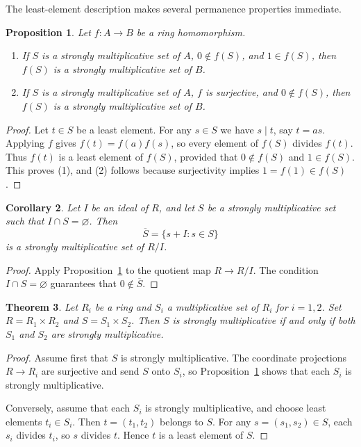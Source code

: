 \documentclass[11pt]{amsart}
\newtheorem{theorem}{Theorem}[section]
\newtheorem{proposition}[theorem]{Proposition}
\newtheorem{corollary}[theorem]{Corollary}
\theoremstyle{definition}
\theoremstyle{remark}
\begin{document}
The least-element description makes several permanence properties immediate.

\begin{proposition}\label{prop:hom}
Let $f \colon A \to B$ be a ring homomorphism.
\begin{enumerate}
\item If $S$ is a strongly multiplicative set of $A$, $0 \notin f(S)$, and $1 \in f(S)$, then $f(S)$ is a strongly multiplicative set of $B$.
\item If $S$ is a strongly multiplicative set of $A$, $f$ is surjective, and $0 \notin f(S)$, then $f(S)$ is a strongly multiplicative set of $B$.
\end{enumerate}
\end{proposition}

\begin{proof}
Let $t \in S$ be a least element.
For any $s \in S$ we have $s \mid t$, say $t=as$.
Applying $f$ gives $f(t)=f(a)f(s)$, so every element of $f(S)$ divides $f(t)$.
Thus $f(t)$ is a least element of $f(S)$, provided that $0 \notin f(S)$ and $1 \in f(S)$.
This proves (1), and (2) follows because surjectivity implies $1=f(1)\in f(S)$.
\end{proof}

\begin{corollary}\label{cor:factor}
Let $I$ be an ideal of $R$, and let $S$ be a strongly multiplicative set such that $I \cap S=\varnothing$.
Then
\[
\overline S=\{s+I : s \in S\}
\]
is a strongly multiplicative set of $R/I$.
\end{corollary}

\begin{proof}
Apply Proposition~\ref{prop:hom} to the quotient map $R \to R/I$.
The condition $I \cap S=\varnothing$ guarantees that $0 \notin \overline S$.
\end{proof}

\begin{theorem}\label{thm:product}
Let $R_i$ be a ring and $S_i$ a multiplicative set of $R_i$ for $i=1,2$.
Set $R=R_1 \times R_2$ and $S=S_1 \times S_2$.
Then $S$ is strongly multiplicative if and only if both $S_1$ and $S_2$ are strongly multiplicative.
\end{theorem}

\begin{proof}
Assume first that $S$ is strongly multiplicative.
The coordinate projections $R \to R_i$ are surjective and send $S$ onto $S_i$, so Proposition~\ref{prop:hom} shows that each $S_i$ is strongly multiplicative.

Conversely, assume that each $S_i$ is strongly multiplicative, and choose least elements $t_i \in S_i$.
Then $t=(t_1,t_2)$ belongs to $S$.
For any $s=(s_1,s_2)\in S$, each $s_i$ divides $t_i$, so $s$ divides $t$.
Hence $t$ is a least element of $S$.
\end{proof}
\end{document}
